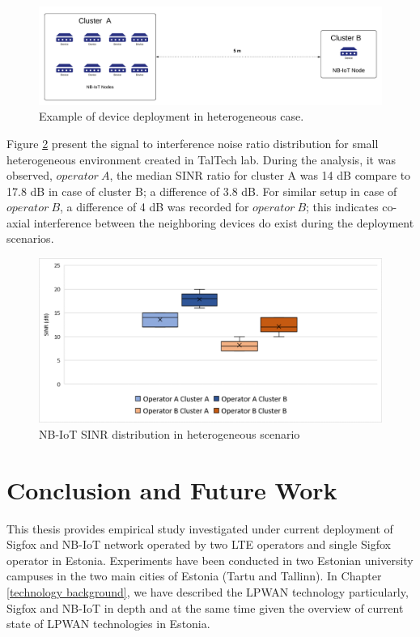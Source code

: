 \documentclass[12pt]{article}
\begin{document}
\begin{figure}[h!]
    \centering
    \includegraphics[width=0.8\linewidth]{Images/hetrogenousCase.pdf}
    \caption{Example of device deployment in heterogeneous case.}
    \label{fig:Example of device deployment in heterogeneous case}
\end{figure}

Figure \ref{fig:SINR distribution} present the signal to interference noise ratio distribution for small heterogeneous environment created in TalTech lab. During the analysis, it was observed, $operator\ A$, the median SINR ratio for cluster A was 14 dB compare to 17.8 dB in case of cluster B; a difference of 3.8 dB. For similar setup in case of $operator\ B$, a difference of 4 dB was recorded for $operator\ B$; this indicates co-axial interference between the neighboring devices do exist during the deployment scenarios.


\begin{figure}[h]
    \centering
    \includegraphics[width=.8\linewidth]{Images/SINRBoxplot.pdf}
    \caption{NB-IoT SINR distribution in heterogeneous scenario}
    \label{fig:SINR distribution}
\end{figure}
\newpage
\section{Conclusion and Future Work} \label{conclusion}
This thesis provides empirical study investigated under current deployment of Sigfox and NB-IoT network operated by two LTE operators and single Sigfox operator in Estonia. Experiments have been conducted in two Estonian university campuses in the two main cities of Estonia (Tartu and Tallinn). In Chapter \ref{technology background}, we have described the LPWAN technology particularly, Sigfox and NB-IoT in depth and at the same time given the overview of current state of LPWAN technologies in Estonia.\par
\end{document}

